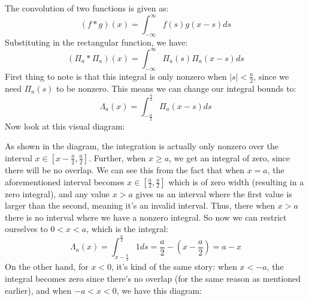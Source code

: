 \documentclass[10pt]{article}
\begin{document}
\begin{enumerate}[label=\alph*)]
		\begin{solution}
			The convolution of two functions is given as:
			\[
				(f \ast g)(x) = \int_{-\infty}^\infty f(s) g(x - s) ds
			\] 
			Substituting in the rectangular function, we have:
			\[
				(\Pi_a \ast \Pi_a)(x) = \int_{-\infty}^\infty \Pi_a(s) \Pi_a(x - s) ds
			\] 
			First thing to note is that this integral is only nonzero when $|s| < \frac{a}{2}$, since we
			need $\Pi_a(s)$ to be nonzero. This means we can change our integral bounds to:
			\[
				\Lambda_a(x) = \int_{-\frac{a}{2}}^{\frac{a}{2}} \Pi_a(x - s) ds
			\] 
			Now look at this visual diagram:
			\begin{center}
			\end{center}
			As shown in the diagram, the integration is actually only nonzero over the interval $x \in [x - \frac{a}{2}, \frac{a}{2}]$.
			 Further, when $x \ge a$, we get an integral of zero, since there will be no overlap. 
			 We can see this from the fact that when $x = a$, the aforementioned interval becomes $x \in [\frac{a}{2}, \frac{a}{2}]$ which is of zero width (resulting in a zero integral), and any value $x > a$ gives us 
			 an interval where the first value is larger than the second, meaning it's an invalid interval. Thus,
			 there when $x > a$ there is no interval where we have a nonzero integral. So now we can restrict
			 ourselves to $0 < x < a$, which is the integral:  
			\[
				\Lambda_a(x) = \int_{x - \frac{a}{2}}^{\frac{a}{2}} 1 ds =\frac{a}{2} - \left( x - \frac{a}{2} \right) = a - x
			\] 
			On the other hand, for $x < 0$, it's kind of the same story: when $x <- a$, the integral becomes 
			zero since there's no overlap (for the same reason as mentioned earlier), and when $-a < x < 0$,
			we have this diagram:
			\begin{center}
\end{center}
\end{solution}
\end{enumerate}
\end{document}
